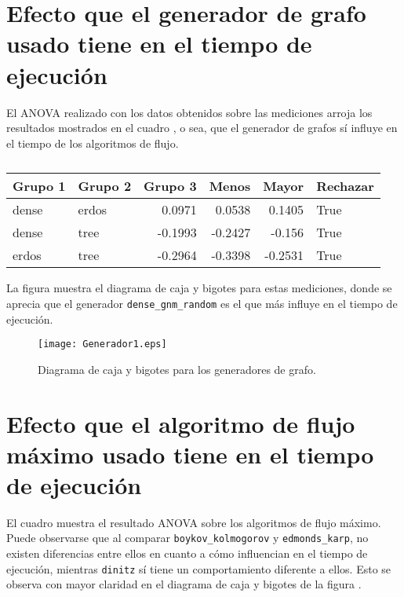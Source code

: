 \documentclass{article}
\begin{document}
 

\section*{Efecto que el generador de grafo usado tiene en el tiempo de ejecución}

El ANOVA realizado con los datos obtenidos sobre las mediciones arroja los resultados mostrados en el cuadro \pageref{Cuadro 1}, o sea, que el generador de grafos sí influye en el tiempo de los algoritmos de flujo.

\begin{table}[htbp]
  \centering
  \caption{}
    \begin{tabular}{|l|l|r|r|r|l|}
    \toprule
    \rowcolor[rgb]{ .357,  .608,  .835} \textbf{Grupo 1} & \textbf{Grupo 2} & \multicolumn{1}{l|}{\textbf{Grupo 3}} & \multicolumn{1}{l|}{\textbf{Menos}} & \multicolumn{1}{l|}{\textbf{Mayor}} & \textbf{Rechazar} \\
    \midrule
    dense & erdos & 0.0971 & 0.0538 & 0.1405 & True \\
    \midrule
    dense & tree  & -0.1993 & -0.2427 & -0.156 & True \\
    \midrule
    erdos & tree  & -0.2964 & -0.3398 & -0.2531 & True \\
    \bottomrule
    \end{tabular}
  \label{tab:Cuadro 1}
\end{table}

La figura \pageref{Figura 2} muestra el diagrama de caja y bigotes para estas mediciones, donde se aprecia que el generador \texttt{dense\_gnm\_random} es el que más influye en el tiempo de ejecución.

\begin{figure}
\begin{center}
  \texttt{[image: Generador1.eps]}
\end{center}
\vspace*{-8mm}
\caption{Diagrama de caja y bigotes para los generadores de grafo.}
  \label{Figura 2} 
\end{figure}

\section*{Efecto que el algoritmo de flujo máximo usado tiene en el tiempo de ejecución}

El cuadro \pageref{Cuadro 2} muestra el resultado ANOVA sobre los algoritmos de flujo máximo. Puede observarse que al comparar \texttt{boykov\_kolmogorov} y \texttt{edmonds\_karp}, no existen diferencias entre ellos en cuanto a cómo influencian en el tiempo de ejecución, mientras \texttt{dinitz} sí tiene un comportamiento diferente a ellos. Esto se observa con mayor claridad en el diagrama de caja y bigotes de la figura \pageref{Figura 3}.
\end{document}
